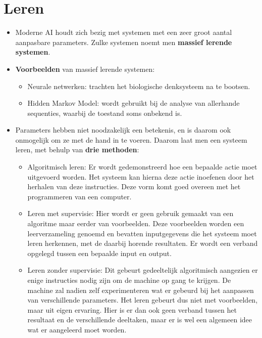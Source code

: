 \section{Leren}
\begin{itemize}
	\item Moderne AI houdt zich bezig met systemen met een zeer groot aantal aanpasbare parameters. Zulke systemen noemt men \textbf{massief lerende systemen}.
	\item \textbf{Voorbeelden} van massief lerende systemen:
	\begin{itemize}
		\item Neurale netwerken: trachten het biologische denksysteem na te bootsen.
		\item Hidden Markov Model: wordt gebruikt bij de analyse van allerhande sequenties, waarbij de toestand soms onbekend is.
	\end{itemize}
	\item Parameters hebben niet noodzakelijk een betekenis, en is daarom ook onmogelijk om ze met de hand in te voeren. Daarom laat men een systeem leren, met behulp van \textbf{drie methoden}:
	\begin{itemize}
		\item Algoritmisch leren: Er wordt gedemonstreerd hoe een bepaalde actie moet uitgevoerd worden. Het systeem kan hierna deze actie inoefenen door het herhalen van deze instructies. Deze vorm komt goed overeen met het programmeren van een computer.
		\item Leren met supervisie: Hier wordt er geen gebruik gemaakt van een algoritme maar eerder van voorbeelden. Deze voorbeelden worden een leerverzameling genoemd en bevatten inputgegevens die het systeem moet leren herkennen, met de daarbij horende resultaten. Er wordt een verband opgelegd tussen een bepaalde input en output.
		\item Leren zonder supervisie: Dit gebeurt gedeeltelijk algoritmisch aangezien er enige instructies nodig zijn om de machine op gang te krijgen. De machine zal nadien zelf experimenteren wat er gebeurd bij het aanpassen van verschillende parameters. Het leren gebeurt dus niet met voorbeelden, maar uit eigen ervaring. Hier is er dan ook geen verband tussen het resultaat en de verschillende deeltaken, maar er is wel een algemeen idee wat er aangeleerd moet worden.
	\end{itemize}
\end{itemize}
